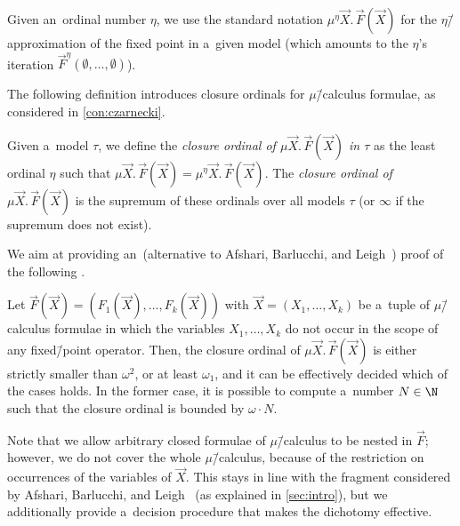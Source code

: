 Given an~ordinal number $\eta$, we use the standard notation $\mu^\eta \vec{X}.\,\vec{F}(\vec{X})$ for the $\eta$\=/approximation of the fixed point in a~given model
(which amounts to the $\eta$'s iteration $\vec{F}^{\eta}(\emptyset,\dots,\emptyset)$).

The following definition introduces closure ordinals for $\mu$\=/calculus formulae, as considered in \cref{con:czarnecki}.

\begin{defi}
	Given a~model $\tau$, we define the \emph{closure ordinal of $\mu \vec{X}.\, \vec{F}(\vec{X})$ in $\tau$} as the least ordinal $\eta$ such that $\mu \vec{X}.\,\vec{F}(\vec{X}) = \mu^\eta \vec{X}.\,\vec{F}(\vec{X})$.
	The \emph{closure ordinal of $\mu \vec{X}.\,\vec{F}(\vec{X})$} is the supremum of these ordinals over all models $\tau$ (or $\infty$ if the supremum does not exist).
\end{defi}

We aim at providing an~(alternative to Afshari, Barlucchi, and Leigh~\cite{afshari_limit_fics}) proof of the following .

\begin{thm}\label{thm:closure-mu}
	Let $\vec{F}(\vec{X})=(F_1(\vec{X}),\dots,F_k(\vec{X}))$ with $\vec{X}=(X_1,\dots,X_k)$ be a~tuple of $\mu$\=/calculus formulae in which the variables $X_1,\dots,X_k$ do not occur in the scope of any fixed\=/point operator.
	Then, the closure ordinal of $\mu \vec{X}.\,\vec{F}(\vec{X})$ is either strictly smaller than $\omega^2$, or at least $\omega_1$, and it can be effectively decided which of the cases holds.
	In the former case, it is possible to compute a~number $N\in\N$ such that the closure ordinal is bounded by $\omega\cdot N$.
\end{thm}
\noindent %
Note that we allow arbitrary closed formulae of $\mu$\=/calculus to be nested in $\vec{F}$;
however, we do not cover the whole $\mu$\=/calculus, because of the restriction on occurrences of the variables of $\vec{X}$.
This stays in line with the fragment considered by Afshari, Barlucchi,
and Leigh~\cite{afshari_limit_fics} (as explained in \cref{sec:intro}),
but we additionally provide a~decision procedure that makes the
dichotomy effective.

